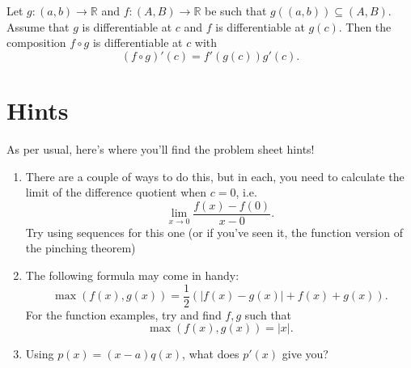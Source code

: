 \documentclass[
  17pt,
  a4paper]{extarticle}
\providecommand{\tightlist}{%
  \setlength{\itemsep}{0pt}\setlength{\parskip}{0pt}}
\theoremstyle{plain}
\theoremstyle{definition}
\theoremstyle{plain}
\theoremstyle{plain}
\theoremstyle{plain}
\theoremstyle{plain}
\theoremstyle{definition}
\theoremstyle{definition}
\theoremstyle{remark}
\theoremstyle{remark}
\let\BeginKnitrBlock\begin \let\EndKnitrBlock\end
\renewcommand{\;}{\,}
\begin{document}
\BeginKnitrBlock{theorem}[Chain Rule]
{\label{thm:thm2} }Let \(g:(a,b) \to \mathbb{R}\) and \(f:(A,B) \to \mathbb{R}\) be such that \(g\left((a,b)\right) \subseteq (A,B).\) Assume that \(g\) is differentiable at \(c\) and \(f\) is differentiable at \(g(c)\). Then the composition \(f\circ g\) is differentiable at \(c\) with \[\left(f\circ g\right)'(c) = f'\left(g(c)\right)g'(c).\]
\EndKnitrBlock{theorem}

\hypertarget{hints}{%
\section{Hints}\label{hints}}

As per usual, here's where you'll find the problem sheet hints!

\begin{enumerate}
\def\labelenumi{\arabic{enumi})}
\tightlist
\item
  There are a couple of ways to do this, but in each, you need to calculate the limit of the difference quotient when \(c=0\), i.e.~\[\lim_{x\to 0}\frac{f(x) - f(0)}{x - 0}.\] Try using sequences for this one (or if you've seen it, the function version of the pinching theorem)
\item
  The following formula may come in handy:\[\max(f(x),g(x)) = \frac{1}{2}\left(\lvert f(x) - g(x) \rvert + f(x) + g(x)\right).\]
  For the function examples, try and find \(f,g\) such that \[\max(f(x),g(x)) = \lvert x \rvert.\]
\item
  Using \(p(x) = (x-a)q(x)\), what does \(p'(x)\) give you?
\end{enumerate}
\end{document}

